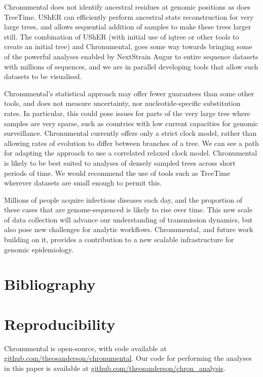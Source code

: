 Chronumental does not identify ancestral residues at genomic positions as does TreeTime. UShER \citep{Turakhia2021-la} can efficiently perform ancestral state reconstruction for very large trees, and allows sequential addition of samples to make these trees larger still. The combination of UShER (with initial use of iqtree \citep{Minh2020-vc} or other tools to create an initial tree) and Chronumental, goes some way towards bringing some of the powerful analyses enabled by NextStrain Augur \citep{Hadfield2018-fb} to entire sequence datasets with millions of sequences, and we are in parallel developing tools \citep{taxonium} that allow such datasets to be visualised.

Chronumental's statistical approach may offer fewer guarantees than some other tools, and does not measure uncertainty, nor nucleotide-specific substitution rates. In particular, this could pose issues for parts of the very large tree where samples are very sparse, such as countries with low current capacities for genomic surveillance. Chronumental currently offers only a strict clock model, rather than allowing rates of evolution to differ between branches of a tree. We can see a path for adapting the approach to use a correlated relaxed clock model. Chronumental is likely to be best suited to analyses of densely sampled trees across short periods of time. We would recommend the use of tools such as TreeTime wherever datasets are small enough to permit this.

Millions of people acquire infectious diseases each day, and the proportion of these cases that are genome-sequenced is likely to rise over time. This new scale of data collection will advance our understanding of transmission dynamics, but also pose new challenges for analytic workflows. Chronumental, and future work building on it, provides a contribution to a new scalable infrastructure for genomic epidemiology.






\section*{Bibliography}





\section*{Reproducibility}
Chronumental is open-source, with code available at \url{github.com/theosanderson/chronumental}. Our code for performing the analyses in this paper is available at \url{github.com/theosanderson/chron_analysis}.

